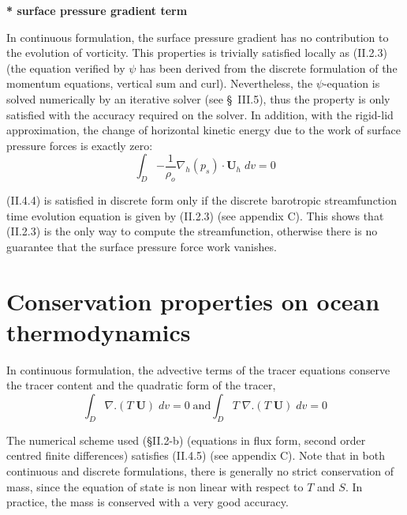 \documentclass[../main/NEMO_manual]{subfiles}
\begin{document}
\textbf{* surface pressure gradient term}

In continuous formulation, the surface pressure gradient has no contribution to the evolution of vorticity.
This properties is trivially satisfied locally as (II.2.3)
(the equation verified by $\psi$ has been derived from the discrete formulation of the momentum equations,
vertical sum and curl).
Nevertheless, the $\psi$-equation is solved numerically by an iterative solver (see {\S}~III.5),
thus the property is only satisfied with the accuracy required on the solver.
In addition, with the rigid-lid approximation, the change of horizontal kinetic energy due to the work of 
surface pressure forces is exactly zero:
\[
  \int_D {-\frac{1}{\rho_o }\nabla _h } \left( {p_s } \right)\cdot {\textbf{U}}_h \;dv=0
\]

(II.4.4) is satisfied in discrete form only if
the discrete barotropic streamfunction time evolution equation is given by (II.2.3) (see appendix C).
This shows that (II.2.3) is the only way to compute the streamfunction,
otherwise there is no guarantee that the surface pressure force work vanishes.

\section{Conservation properties on ocean thermodynamics}
\label{sec:Invariant_tra}

In continuous formulation, the advective terms of the tracer equations conserve the tracer content and
the quadratic form of the tracer, \ie
\[
  \int_D {\nabla .\left( {T\;{\textbf{U}}} \right)\;dv} =0
  \;\text{and}
  \int_D {T\;\nabla .\left( {T\;{\textbf{U}}} \right)\;dv} =0
\]

The numerical scheme used ({\S}II.2-b) (equations in flux form, second order centred finite differences) satisfies
(II.4.5) (see appendix C).
Note that in both continuous and discrete formulations, there is generally no strict conservation of mass,
since the equation of state is non linear with respect to $T$ and $S$.
In practice, the mass is conserved with a very good accuracy. 

\end{document}
